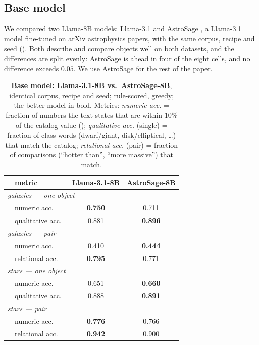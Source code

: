 \subsection{Base model}\label{app:basemodel}
We compared two Llama-8B models: Llama-3.1 and AstroSage \citep{haan2025_astrosage}, a
Llama-3.1 model fine-tuned on arXiv astrophysics papers, with the same corpus, recipe and seed
(). Both describe and compare objects well on both datasets, and the
differences are split evenly: AstroSage is ahead in four of the eight cells, and no difference
exceeds $0.05$. We use AstroSage for the rest of the paper.

\begin{table}[h]\centering\small
\caption{\textbf{Base model: Llama-3.1-8B vs.\ AstroSage-8B}, identical
corpus, recipe and seed; rule-scored, greedy; the better model in bold.
Metrics: \emph{numeric acc.} = fraction of numbers the text states that are
within $10\%$ of the catalog value (); \emph{qualitative acc.} (single) =
fraction of class words (dwarf/giant, disk/elliptical, \ldots) that match
the catalog; \emph{relational acc.} (pair) = fraction of comparisons
(``hotter than'', ``more massive'') that match.
}
\label{tab:basemodel}
\begin{tabular}{llcc}
\toprule
 & metric & Llama-3.1-8B & AstroSage-8B \\
\midrule
\multicolumn{4}{l}{\emph{galaxies --- one object}}\\
 & numeric acc.\     & \textbf{0.750} & 0.711 \\
 & qualitative acc.\ & 0.881 & \textbf{0.896} \\
\multicolumn{4}{l}{\emph{galaxies --- pair}}\\
 & numeric acc.\     & 0.410 & \textbf{0.444} \\
 & relational acc.\  & \textbf{0.795} & 0.771 \\
\midrule
\multicolumn{4}{l}{\emph{stars --- one object}}\\
 & numeric acc.\     & 0.651 & \textbf{0.660} \\
 & qualitative acc.\ & 0.888 & \textbf{0.891} \\
\multicolumn{4}{l}{\emph{stars --- pair}}\\
 & numeric acc.\     & \textbf{0.776} & 0.766 \\
 & relational acc.\  & \textbf{0.942} & 0.900 \\
\bottomrule
\end{tabular}
\end{table}


